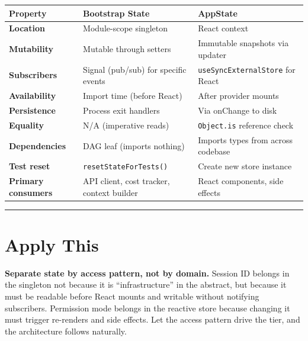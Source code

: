 \documentclass[
  english,
  11pt,
  letterpaper,
]{book}
\begin{document}
\begin{longtable}[]{@{}
  >{\raggedright\arraybackslash}p{}
  >{\raggedright\arraybackslash}p{}
  >{\raggedright\arraybackslash}p{}@{}}
\toprule\noalign{}
\begin{minipage}[b]{\linewidth}\raggedright
Property
\end{minipage} & \begin{minipage}[b]{\linewidth}\raggedright
Bootstrap State
\end{minipage} & \begin{minipage}[b]{\linewidth}\raggedright
AppState
\end{minipage} \\
\midrule\noalign{}
\endhead
\bottomrule\noalign{}
\endlastfoot
\textbf{Location} & Module-scope singleton & React context \\
\textbf{Mutability} & Mutable through setters & Immutable snapshots via
updater \\
\textbf{Subscribers} & Signal (pub/sub) for specific events &
\texttt{useSyncExternalStore} for React \\
\textbf{Availability} & Import time (before React) & After provider
mounts \\
\textbf{Persistence} & Process exit handlers & Via onChange to disk \\
\textbf{Equality} & N/A (imperative reads) & \texttt{Object.is}
reference check \\
\textbf{Dependencies} & DAG leaf (imports nothing) & Imports types from
across codebase \\
\textbf{Test reset} & \texttt{resetStateForTests()} & Create new store
instance \\
\textbf{Primary consumers} & API client, cost tracker, context builder &
React components, side effects \\
\end{longtable}

\begin{center}\rule{0.5\linewidth}{0.5pt}\end{center}

\section{Apply This}\label{apply-this-2}

\textbf{Separate state by access pattern, not by domain.} Session ID
belongs in the singleton not because it is ``infrastructure'' in the
abstract, but because it must be readable before React mounts and
writable without notifying subscribers. Permission mode belongs in the
reactive store because changing it must trigger re-renders and side
effects. Let the access pattern drive the tier, and the architecture
follows naturally.
\end{document}
